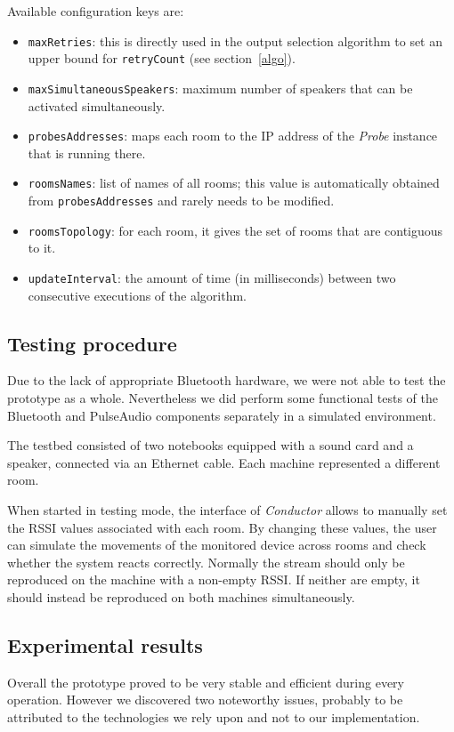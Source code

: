 \documentclass{IEEEtran}
\newcommand{\Conductor}{\textsl{Conductor}}
\newcommand{\Probe}{\textsl{Probe}}
\begin{document}
Available configuration keys are:
\begin{itemize}
\item \texttt{maxRetries}: this is directly used in the output selection algorithm to set an upper bound for \texttt{retryCount} (see section~\ref{algo}).
\item \texttt{maxSimultaneousSpeakers}: maximum number of speakers that can be activated simultaneously.
\item \texttt{probesAddresses}: maps each room to the IP address of the \Probe{} instance that is running there.
\item \texttt{roomsNames}: list of names of all rooms; this value is automatically obtained from \texttt{probesAddresses} and rarely needs to be modified.
\item \texttt{roomsTopology}: for each room, it gives the set of rooms that are contiguous to it.
\item \texttt{updateInterval}: the amount of time (in milliseconds) between two consecutive executions of the algorithm.
\end{itemize}

\subsection{Testing procedure}
Due to the lack of appropriate Bluetooth hardware, we were not able to test the prototype as a whole. Nevertheless we did perform some functional tests of the Bluetooth and PulseAudio components separately in a simulated environment.

The testbed consisted of two notebooks equipped with a sound card and a speaker, connected via an Ethernet cable. Each machine represented a different room.

When started in testing mode, the interface of \Conductor{} allows to manually set the RSSI values associated with each room. By changing these values, the user can simulate the movements of the monitored device across rooms and check whether the system reacts correctly. Normally the stream should only be reproduced on the machine with a non-empty RSSI. If neither are empty, it should instead be reproduced on both machines simultaneously.

\subsection{Experimental results}
Overall the prototype proved to be very stable and efficient during every operation. However we discovered two noteworthy issues, probably to be attributed to the technologies we rely upon and not to our implementation.
\end{document}
